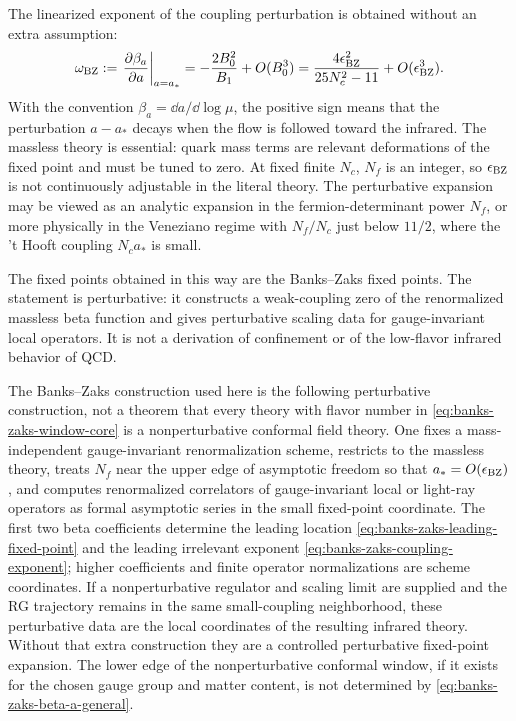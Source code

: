 The linearized exponent of the coupling perturbation is obtained without an
extra assumption:
\begin{equation}
  \omega_{\rm BZ}
  :=
  \left.\frac{\partial\beta_a}{\partial a}\right|_{a=a_*}
  =
  -\frac{2B_0^2}{B_1}+O(B_0^3)
  =
  \frac{4\epsilon_{\rm BZ}^2}{25N_c^2-11}
  +O(\epsilon_{\rm BZ}^3).
  \label{eq:banks-zaks-coupling-exponent}
\end{equation}
With the convention \(\beta_a=\dd a/\dd\log\mu\), the positive sign means that
the perturbation \(a-a_*\) decays when the flow is followed toward the
infrared.  The massless theory is essential: quark mass terms are relevant
deformations of the fixed point and must be tuned to zero.  At fixed finite
\(N_c\), \(N_f\) is an integer, so \(\epsilon_{\rm BZ}\) is not continuously
adjustable in the literal theory.  The perturbative expansion may be viewed
as an analytic expansion in the fermion-determinant power \(N_f\), or more
physically in the Veneziano regime with \(N_f/N_c\) just below \(11/2\), where
the 't Hooft coupling \(N_c a_*\) is small.

The fixed points obtained in this way are the Banks--Zaks fixed points.  The
statement is perturbative: it constructs a weak-coupling zero of the
renormalized massless beta function and gives perturbative scaling data for
gauge-invariant local operators.  It is not a derivation of confinement or of
the low-flavor infrared behavior of QCD.

\begin{controlledapproximation}
\label{ca:qcd-banks-zaks-status}
The Banks--Zaks construction used here is the following perturbative construction,
not a theorem that every theory with flavor number in
\eqref{eq:banks-zaks-window-core} is a nonperturbative conformal field theory.
One fixes a mass-independent gauge-invariant renormalization scheme, restricts
to the massless theory, treats \(N_f\) near the upper edge of asymptotic
freedom so that \(a_*=O(\epsilon_{\rm BZ})\), and computes renormalized
correlators of gauge-invariant local or light-ray operators as formal
asymptotic series in the small fixed-point coordinate.  The first two beta
coefficients determine the leading location
\eqref{eq:banks-zaks-leading-fixed-point} and the leading irrelevant exponent
\eqref{eq:banks-zaks-coupling-exponent}; higher coefficients and finite
operator normalizations are scheme coordinates.  If a nonperturbative
regulator and scaling limit are supplied and the RG trajectory remains in the
same small-coupling neighborhood, these perturbative data are the local
coordinates of the resulting infrared theory.  Without that extra
construction they are a controlled perturbative fixed-point expansion.  The
lower edge of the nonperturbative conformal window, if it exists for the
chosen gauge group and matter content, is not determined by
\eqref{eq:banks-zaks-beta-a-general}.
\end{controlledapproximation}

